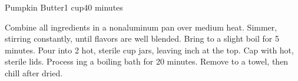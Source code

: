 \documentclass[../Cookbook.tex]{subfiles}
\begin{document}
\begin{recipe}{Pumpkin Butter}{1 cup}{40 minutes}

Combine all ingredients in a nonaluminum pan over medium heat. Simmer, stirring constantly, until flavors are well blended. Bring to a slight boil for 5 minutes. Pour into 2 hot, sterile  cup jars, leaving  inch at the top. Cap with hot, sterile lids. Process ing a boiling bath for 20 minutes. Remove to a towel, then chill after dried.

\end{recipe}
\end{document}
